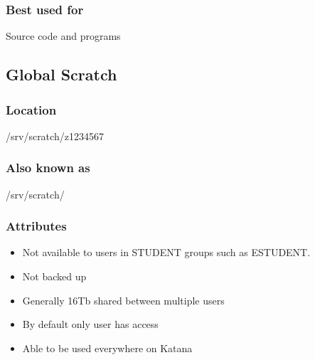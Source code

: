 \documentclass[letterpaper,10pt,english]{sphinxmanual}
\begin{document}
\subsubsection{Best used for}
\label{\detokenize{storage/storage_locations:best-used-for}}
Source code and programs


\subsection{Global Scratch}
\label{\detokenize{storage/storage_locations:global-scratch}}

\subsubsection{Location}
\label{\detokenize{storage/storage_locations:id1}}
\begin{sphinxVerbatim}[commandchars=\\\{\}]
/srv/scratch/z1234567
\end{sphinxVerbatim}


\subsubsection{Also known as}
\label{\detokenize{storage/storage_locations:id2}}
\begin{sphinxVerbatim}[commandchars=\\\{\}]
/srv/scratch/
\end{sphinxVerbatim}


\subsubsection{Attributes}
\label{\detokenize{storage/storage_locations:id3}}\begin{itemize}
\item {} 
Not available to users in STUDENT groups such as ESTUDENT.

\item {} 
Not backed up

\item {} 
Generally 16Tb shared between multiple users

\item {} 
By default only user has access

\item {} 
Able to be used everywhere on Katana

\end{itemize}
\end{document}
